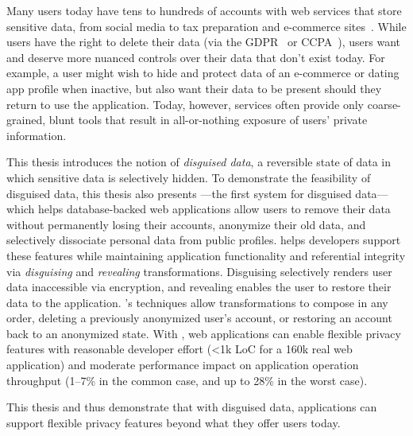 Many users today have tens to hundreds of accounts with web services that store
sensitive data, from social media to tax preparation and e-commerce
sites~\cite{tens,hundreds,password_life_cycle}.
%
While users have the right to delete their data (via \eg the
GDPR~\cite{eu:gdpr} or CCPA~\cite{ccpa}), users want and deserve more nuanced
controls over their data that don't exist today.
%
For example, a user might wish to hide
and protect data of an e-commerce or dating app profile when inactive, but also
want their data to be present should they return to use the application. 
%
Today, however, services often provide only coarse-grained, blunt tools that
result in all-or-nothing exposure of users’ private information.
%

%
This thesis introduces the notion of \emph{disguised data}, a reversible state
of data in which sensitive data is selectively hidden.
%
To demonstrate the feasibility of disguised data, this thesis also presents
\sys---the first system for disguised data---which helps database-backed web applications allow users
to remove their data without permanently losing their accounts, anonymize their
old data, and selectively dissociate personal data from public profiles.
%
\sys helps developers support these features while maintaining application
functionality and referential integrity via \emph{disguising} and
\emph{revealing} transformations.
%
Disguising selectively renders user data inaccessible via encryption, and
revealing enables the user to restore their data to the application.
%
\sys's techniques allow transformations to compose in any order, \eg deleting a
previously anonymized user's account, or restoring an account back to an
anonymized state.
%
With \sys, web applications can enable flexible privacy features with reasonable
developer effort (<1k LoC for a 160k real web application) and moderate
performance impact on application operation throughput (1--7\% in
the common case, and up to 28\% in the worst case).
%

This thesis and \sys thus demonstrate that with disguised data, applications
can support flexible privacy features beyond what they offer users today.
%

